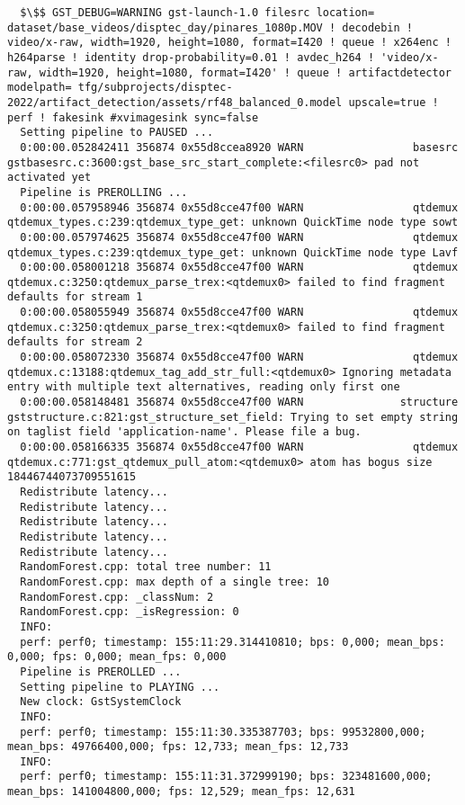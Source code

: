 \documentclass[12pt,oneside]{book}
\begin{document}
\begin{lstlisting}
  $\$$ GST_DEBUG=WARNING gst-launch-1.0 filesrc location= dataset/base_videos/disptec_day/pinares_1080p.MOV ! decodebin ! video/x-raw, width=1920, height=1080, format=I420 ! queue ! x264enc ! h264parse ! identity drop-probability=0.01 ! avdec_h264 ! 'video/x-raw, width=1920, height=1080, format=I420' ! queue ! artifactdetector modelpath= tfg/subprojects/disptec-2022/artifact_detection/assets/rf48_balanced_0.model upscale=true ! perf ! fakesink #xvimagesink sync=false
  Setting pipeline to PAUSED ...
  0:00:00.052842411 356874 0x55d8ccea8920 WARN                 basesrc gstbasesrc.c:3600:gst_base_src_start_complete:<filesrc0> pad not activated yet
  Pipeline is PREROLLING ...
  0:00:00.057958946 356874 0x55d8cce47f00 WARN                 qtdemux qtdemux_types.c:239:qtdemux_type_get: unknown QuickTime node type sowt
  0:00:00.057974625 356874 0x55d8cce47f00 WARN                 qtdemux qtdemux_types.c:239:qtdemux_type_get: unknown QuickTime node type Lavf
  0:00:00.058001218 356874 0x55d8cce47f00 WARN                 qtdemux qtdemux.c:3250:qtdemux_parse_trex:<qtdemux0> failed to find fragment defaults for stream 1
  0:00:00.058055949 356874 0x55d8cce47f00 WARN                 qtdemux qtdemux.c:3250:qtdemux_parse_trex:<qtdemux0> failed to find fragment defaults for stream 2
  0:00:00.058072330 356874 0x55d8cce47f00 WARN                 qtdemux qtdemux.c:13188:qtdemux_tag_add_str_full:<qtdemux0> Ignoring metadata entry with multiple text alternatives, reading only first one
  0:00:00.058148481 356874 0x55d8cce47f00 WARN               structure gststructure.c:821:gst_structure_set_field: Trying to set empty string on taglist field 'application-name'. Please file a bug.
  0:00:00.058166335 356874 0x55d8cce47f00 WARN                 qtdemux qtdemux.c:771:gst_qtdemux_pull_atom:<qtdemux0> atom has bogus size 18446744073709551615
  Redistribute latency...
  Redistribute latency...
  Redistribute latency...
  Redistribute latency...
  Redistribute latency...
  RandomForest.cpp: total tree number: 11
  RandomForest.cpp: max depth of a single tree: 10
  RandomForest.cpp: _classNum: 2
  RandomForest.cpp: _isRegression: 0
  INFO:
  perf: perf0; timestamp: 155:11:29.314410810; bps: 0,000; mean_bps: 0,000; fps: 0,000; mean_fps: 0,000
  Pipeline is PREROLLED ...
  Setting pipeline to PLAYING ...
  New clock: GstSystemClock
  INFO:
  perf: perf0; timestamp: 155:11:30.335387703; bps: 99532800,000; mean_bps: 49766400,000; fps: 12,733; mean_fps: 12,733
  INFO:
  perf: perf0; timestamp: 155:11:31.372999190; bps: 323481600,000; mean_bps: 141004800,000; fps: 12,529; mean_fps: 12,631

\end{lstlisting}
\end{document}
